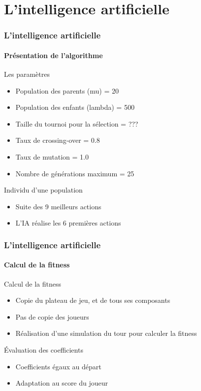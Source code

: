 \section{L'intelligence artificielle}

\begin{frame}
	\frametitle{L'intelligence artificielle}
	\framesubtitle{Présentation de l'algorithme}
	
	\begin{block}{Les paramètres}
		\begin{itemize}
			\item Population des parents (mu) = 20
			\item Population des enfants (lambda) = 500
			\item Taille du tournoi pour la sélection = ???
			\item Taux de crossing-over = 0.8
			\item Taux de mutation = 1.0
			\item Nombre de générations maximum = 25
		\end{itemize}
	\end{block}	
	
	\begin{exampleblock}{Individu d'une population}
		\begin{itemize}
			\item Suite des 9 meilleurs actions
			\item L'IA réalise les 6 premières actions
		\end{itemize}
	\end{exampleblock}	
\end{frame}

\begin{frame}
	\frametitle{L'intelligence artificielle}
	\framesubtitle{Calcul de la fitness}
	
	\begin{block}{Calcul de la fitness}
		\begin{itemize}
			\item Copie du plateau de jeu, et de tous ses composants
			\item Pas de copie des joueurs
			\item Réalisation d'une simulation du tour pour calculer la fitness
		\end{itemize}
	\end{block}

	\begin{block}{Évaluation des coefficients}
		\begin{itemize}
			\item Coefficients égaux au départ
			\item Adaptation au score du joueur
		\end{itemize}
	\end{block}
\end{frame}

